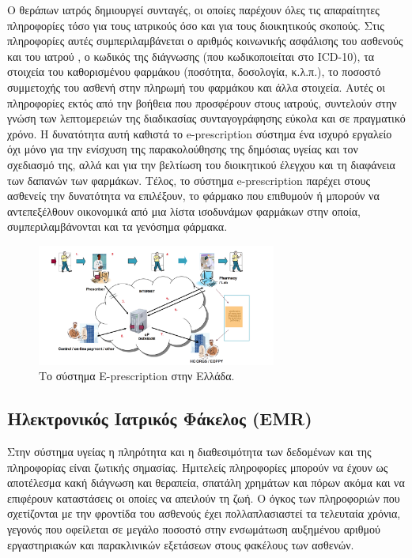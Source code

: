 	Ο θεράπων ιατρός δημιουργεί συνταγές, οι οποίες παρέχουν όλες τις απαραίτητες πληροφορίες τόσο για τους ιατρικούς όσο και για τους διοικητικούς σκοπούς.  Στις πληροφορίες αυτές συμπεριλαμβάνεται ο αριθμός κοινωνικής ασφάλισης  του ασθενούς και του ιατρού , ο κωδικός της διάγνωσης (που κωδικοποιείται στο ICD-10), τα στοιχεία του καθορισμένου φαρμάκου (ποσότητα, δοσολογία, κ.λ.π.), το ποσοστό συμμετοχής του ασθενή στην πληρωμή του φαρμάκου και άλλα στοιχεία.  Αυτές οι πληροφορίες εκτός από την βοήθεια που προσφέρουν στους ιατρούς, συντελούν στην γνώση των λεπτομερειών της διαδικασίας συνταγογράφησης εύκολα και σε πραγματικό χρόνο. Η δυνατότητα αυτή καθιστά το e-prescription σύστημα ένα ισχυρό εργαλείο όχι μόνο για την ενίσχυση της παρακολούθησης της δημόσιας υγείας και τον σχεδιασμό της, αλλά και για την βελτίωση του διοικητικού έλεγχου
και τη διαφάνεια των δαπανών των φαρμάκων. Τέλος, το σύστημα e-prescription παρέχει στους ασθενείς την δυνατότητα να  επιλέξουν, το φάρμακο που επιθυμούν ή μπορούν να αντεπεξέλθουν οικονομικά από μια λίστα ισοδυνάμων φαρμάκων στην οποία, συμπεριλαμβάνονται και τα γενόσημα φάρμακα. 

	\begin{figure}[h]
	    \centering
	    \includegraphics[width=0.7\textwidth]{e-prescr.png}
	    \caption{Το σύστημα E-prescription στην Ελλάδα. }
	    \label{fig:prescr}
	\end{figure}


	

	
	\subsection{Ηλεκτρονικός Ιατρικός Φάκελος (EMR)}
	

		Στην σύστημα υγείας η πληρότητα και η διαθεσιμότητα των δεδομένων και της πληροφορίας είναι ζωτικής σημασίας. Ημιτελείς πληροφορίες μπορούν να έχουν ως αποτέλεσμα κακή διάγνωση και θεραπεία, σπατάλη χρημάτων και πόρων ακόμα και να επιφέρουν καταστάσεις οι οποίες να απειλούν τη ζωή. Ο όγκος των πληροφοριών που σχετίζονται με την φροντίδα του ασθενούς έχει πολλαπλασιαστεί τα τελευταία χρόνια, γεγονός που οφείλεται σε μεγάλο ποσοστό στην ενσωμάτωση αυξημένου αριθμού εργαστηριακών και παρακλινικών εξετάσεων στους φακέλους των ασθενών.
	
